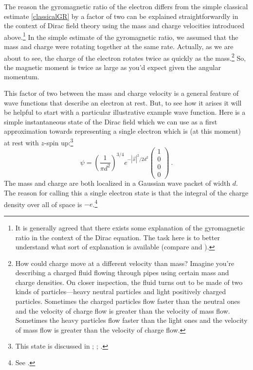\documentclass[onecolumn,secnumarabic,amsmath,amssymb,balancelastpage,nofootinbib]{article}
\begin{document}
The reason the gyromagnetic ratio of the electron differs from the simple classical estimate \eqref{classicalGR} by a factor of two can be explained straightforwardly in the context of Dirac field theory using the mass and charge velocities introduced above.\footnote{It is generally agreed that there exists some explanation of the gyromagnetic ratio in the context of the Dirac equation.  The task here is to better understand what sort of explanation is available (compare \citealp[pg.\ 504]{ohanian} and \citealp[section 1.4]{bjorkendrell}).}  In the simple estimate of the gyromagnetic ratio, we assumed that the mass and charge were rotating together at the same rate.  Actually, as we are about to see, the charge of the electron rotates twice as quickly as the mass.\footnote{How could charge move at a different velocity than mass?  Imagine you're describing a charged fluid flowing through pipes using certain mass and charge densities.  On closer inspection, the fluid turns out to be made of two kinds of particles---heavy neutral particles and light positively charged particles.  Sometimes the charged particles flow faster than the neutral ones and the velocity of charge flow is greater than the velocity of mass flow.  Sometimes the heavy particles flow faster than the light ones and the velocity of mass flow is greater than the velocity of charge flow.}  So, the magnetic moment is twice as large as you'd expect given the angular momentum.

This factor of two between the mass and charge velocity is a general feature of wave functions that describe an electron at rest.  But, to see how it arises it will be helpful to start with a particular illustrative example wave function.  Here is a simple instantaneous state of the Dirac field which we can use as a first approximation towards representing a single electron which is (at this moment) at rest with $z$-spin up:\footnote{This state is discussed in \citet[equation 12]{huang1952}; \citet[equation 3.32]{bjorkendrell}; \citet[equation 14]{ohanian}.}
\begin{equation}
\psi=\left(\frac{1}{\pi d^2}\right)^{3/4}e^{-|\vec{x}|^2/2d^2}\left(\begin{matrix} 1\\0\\0\\0 \end{matrix}\right)\ .
\label{ohanianstate}
\end{equation}
The mass and charge are both localized in a Gaussian wave packet of width $d$.  The reason for calling this a single electron state is that the integral of the charge density over all of space is $-e$.\footnote{See \citet[pg.\ 10]{takabayasi1957}.}
\end{document}
